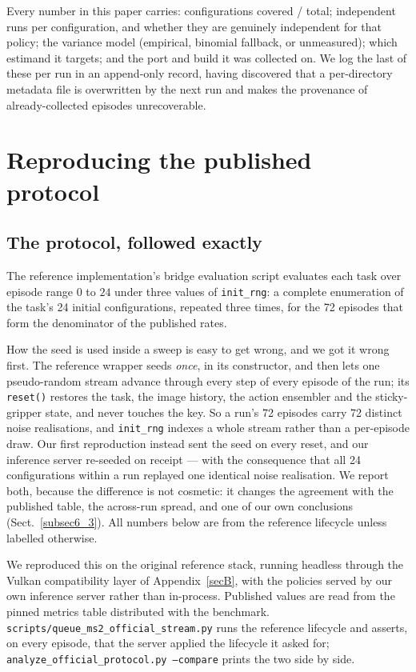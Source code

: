\documentclass[pdflatex,iicol,sn-apa]{sn-jnl}
\theoremstyle{remark}
\begin{document}
Every number in this paper carries: configurations covered / total; independent runs per
configuration, and whether they are genuinely independent for that policy; the variance model
(empirical, binomial fallback, or unmeasured); which estimand it targets; and the port and build it
was collected on. We log the last of these per run in an append-only record, having discovered that
a per-directory metadata file is overwritten by the next run and makes the provenance of
already-collected episodes unrecoverable.

\section{Reproducing the published protocol}\label{sec6}

\subsection{The protocol, followed exactly}\label{subsec6_1}

The reference implementation's bridge evaluation script evaluates each task over episode range $0$ to
$24$ under three values of \texttt{init\_rng}: a complete enumeration of the task's 24 initial
configurations, repeated three times, for the 72 episodes that form the denominator of the published
rates.

How the seed is used inside a sweep is easy to get wrong, and we got it wrong first. The reference
wrapper seeds \emph{once}, in its constructor, and then lets one pseudo-random stream advance through
every step of every episode of the run; its \texttt{reset()} restores the task, the image history,
the action ensembler and the sticky-gripper state, and never touches the key. So a run's 72 episodes
carry 72 distinct noise realisations, and \texttt{init\_rng} indexes a whole stream rather than a
per-episode draw. Our first reproduction instead sent the seed on every reset, and our inference
server re-seeded on receipt --- with the consequence that all 24 configurations within a run replayed
one identical noise realisation. We report both, because the difference is not cosmetic: it changes
the agreement with the published table, the across-run spread, and one of our own conclusions
(Sect.~\ref{subsec6_3}). All numbers below are from the reference lifecycle unless labelled
otherwise.

We reproduced this on the original reference stack, running headless through the Vulkan compatibility
layer of Appendix~\ref{secB}, with the policies served by our own inference server rather than
in-process. Published values are read from the pinned metrics table distributed with the benchmark.
\texttt{scripts/queue\_ms2\_official\_stream.py} runs the reference lifecycle and asserts, on every
episode, that the server applied the lifecycle it asked for; \texttt{analyze\_official\_protocol.py
--compare} prints the two side by side.
\end{document}
